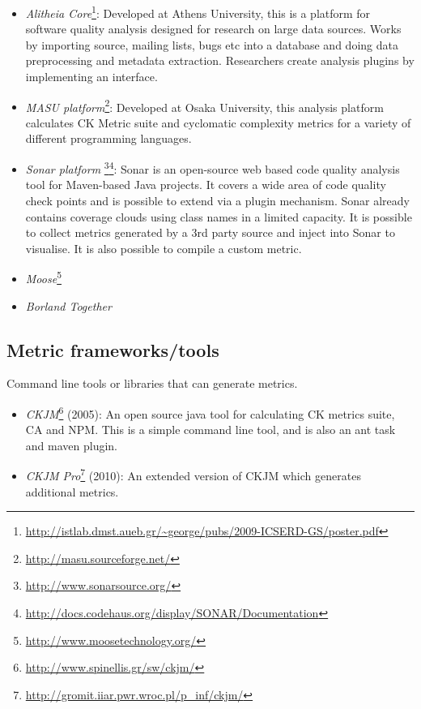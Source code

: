 \begin{itemize}

	\item \textit{Alitheia Core}\footnote{\url{http://istlab.dmst.aueb.gr/~george/pubs/2009-ICSERD-GS/poster.pdf}}: Developed at Athens University, this is a platform for software quality analysis designed for research on large data sources. Works by importing source, mailing lists, bugs etc into a database and doing data preprocessing and metadata extraction. Researchers create analysis plugins by implementing an interface. 

	\item \textit{MASU platform}\footnote{\url{http://masu.sourceforge.net/}}: Developed at Osaka University, this analysis platform calculates CK Metric suite and cyclomatic complexity metrics for a variety of different programming languages.

	\item \textit{Sonar platform} \footnote{\url{http://www.sonarsource.org/}}\footnote{\url{http://docs.codehaus.org/display/SONAR/Documentation}}: Sonar is an open-source web based code quality analysis tool for Maven-based Java projects. It covers a wide area of code quality check points and is possible to extend via a plugin mechanism. Sonar already contains coverage clouds using class names in a limited capacity. It is possible to collect metrics generated by a 3rd party source and inject into Sonar to visualise. It is also possible to compile a custom metric.

	\item \textit{Moose}\footnote{\url{http://www.moosetechnology.org/}}

	\item \textit{Borland Together} 

\end{itemize}

\subsection{Metric frameworks/tools}

Command line tools or libraries that can generate metrics.

\begin{itemize}

	\item \textit{CKJM}\footnote{\url{http://www.spinellis.gr/sw/ckjm/}} (2005):  An open source java tool for calculating CK metrics suite, CA and NPM. This is a simple command line tool, and is also an ant task and maven plugin. 

	\item \textit{CKJM Pro}\footnote{\url{http://gromit.iiar.pwr.wroc.pl/p_inf/ckjm/}} (2010): An extended version of CKJM which generates additional metrics.

\end{itemize}

